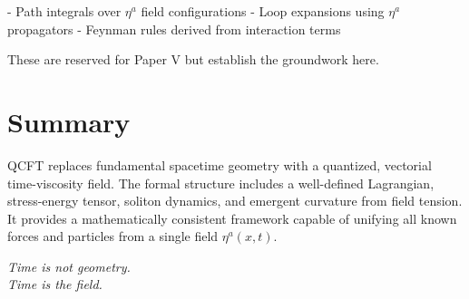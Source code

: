 \documentclass[12pt]{article}
\begin{document}
- Path integrals over $\eta^a$ field configurations
- Loop expansions using $\eta^a$ propagators
- Feynman rules derived from interaction terms

These are reserved for Paper V but establish the groundwork here.

\section*{Summary}

QCFT replaces fundamental spacetime geometry with a quantized, vectorial time-viscosity field. The formal structure includes a well-defined Lagrangian, stress-energy tensor, soliton dynamics, and emergent curvature from field tension. It provides a mathematically consistent framework capable of unifying all known forces and particles from a single field $\eta^a(x,t)$.

\begin{center}
\emph{Time is not geometry.\\
Time is the field.}
\end{center}
\end{document}
